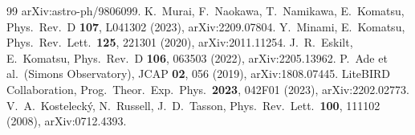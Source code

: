\documentclass[11pt]{article}
\begin{document}
\begin{thebibliography}{99}
  arXiv:astro-ph/9806099.
 K.~Murai, F.~Naokawa, T.~Namikawa, E.~Komatsu, Phys.\ Rev.\ D
  \textbf{107}, L041302 (2023), arXiv:2209.07804.
 Y.~Minami, E.~Komatsu, Phys.\ Rev.\ Lett.\ \textbf{125}, 221301 (2020),
  arXiv:2011.11254.
 J.~R.~Eskilt, E.~Komatsu, Phys.\ Rev.\ D \textbf{106}, 063503 (2022),
  arXiv:2205.13962.
 P.~Ade et al.\ (Simons Observatory), JCAP \textbf{02}, 056 (2019),
  arXiv:1808.07445.
 LiteBIRD Collaboration, Prog.\ Theor.\ Exp.\ Phys.\ \textbf{2023},
  042F01 (2023), arXiv:2202.02773.
 V.~A.~Kosteleck\'y, N.~Russell, J.~D.~Tasson, Phys.\ Rev.\ Lett.\
  \textbf{100}, 111102 (2008), arXiv:0712.4393.
\end{thebibliography}
\end{document}
